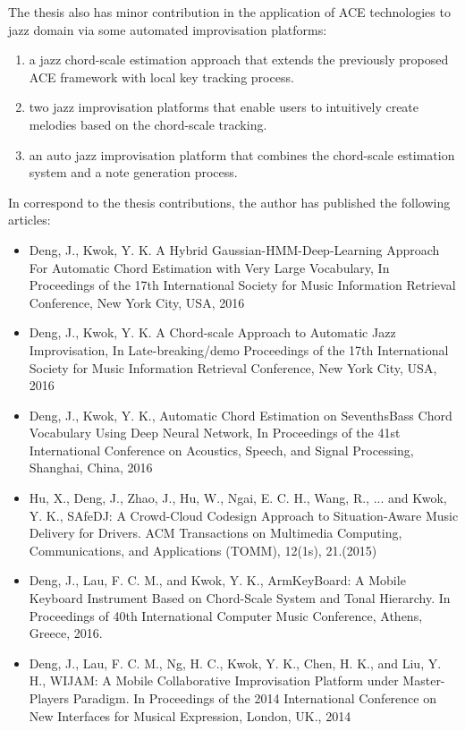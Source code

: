 The thesis also has minor contribution in the application of ACE technologies to jazz domain via some automated improvisation platforms:
\begin{enumerate}
\item a jazz chord-scale estimation approach that extends the previously proposed ACE framework with local key tracking process.
\item two jazz improvisation platforms that enable users to intuitively create melodies based on the chord-scale tracking.
\item an auto jazz improvisation platform that combines the chord-scale estimation system and a note generation process.
\end{enumerate}

In correspond to the thesis contributions, the author has published the following articles:
\begin{itemize}
\item Deng, J., Kwok, Y. K. A Hybrid Gaussian-HMM-Deep-Learning Approach For Automatic Chord Estimation with Very Large Vocabulary, In Proceedings of the 17th International Society for Music Information Retrieval Conference, New York City, USA, 2016
\item Deng, J., Kwok, Y. K. A Chord-scale Approach to Automatic Jazz Improvisation, In Late-breaking/demo Proceedings of the 17th International Society for Music Information Retrieval Conference, New York City, USA, 2016
\item Deng, J., Kwok, Y. K., Automatic Chord Estimation on SeventhsBass Chord Vocabulary Using Deep Neural Network, In Proceedings of the 41st International Conference on Acoustics, Speech, and Signal Processing, Shanghai, China, 2016
\item Hu, X., Deng, J., Zhao, J., Hu, W., Ngai, E. C. H., Wang, R., ... and Kwok, Y. K., SAfeDJ: A Crowd-Cloud Codesign Approach to Situation-Aware Music Delivery for Drivers. ACM Transactions on Multimedia Computing, Communications, and Applications (TOMM), 12(1s), 21.(2015)
\item Deng, J., Lau, F. C. M., and Kwok, Y. K., ArmKeyBoard: A Mobile Keyboard Instrument Based on Chord-Scale System and Tonal Hierarchy. In Proceedings of 40th International Computer Music Conference, Athens, Greece, 2016.
\item Deng, J., Lau, F. C. M., Ng, H. C., Kwok, Y. K., Chen, H. K., and Liu, Y. H., WIJAM: A Mobile Collaborative Improvisation Platform under Master-Players Paradigm. In Proceedings of the 2014 International Conference on New Interfaces for Musical Expression, London, UK., 2014
\end{itemize}

